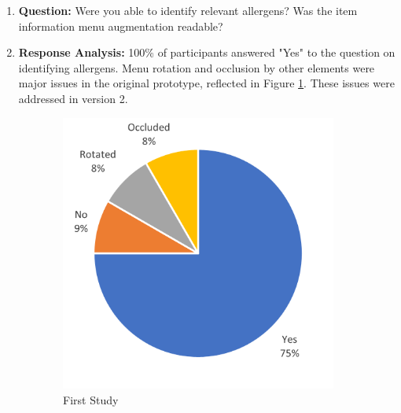 \documentclass[thesis]{fputhesis}
\begin{document}
\begin{body}
\newpage
\begin{enumerate}
    \item[] \textbf{Question: } Were you able to identify relevant allergens? Was the item information menu augmentation readable?
    \item[] \textbf{Response Analysis: } 100\% of participants answered "Yes" to the question on identifying allergens. Menu rotation and occlusion by other elements were major issues in the original prototype, reflected in Figure \ref{fig:readability1}. These issues were addressed in version 2.
\end{enumerate}


\begin{figure}[h]
    \centering
    \begin{subfigure}[]{.45\textwidth}
        \centering
        \includegraphics[width=\textwidth]{Images/readability study 1.png}
        \caption{First Study}
        \label{fig:readability1}
    \end{subfigure}
    \begin{subfigure}[]{.45\textwidth}
        \centering

\end{subfigure}
\end{figure}
\end{body}
\end{document}

